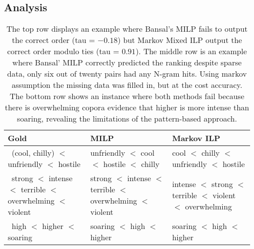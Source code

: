 \subsection{Analysis}


\begin{table}
\small
\centering
\begin{tabular}{|l|l|l|}
% 
\hline 
\bf Gold & \bf MILP & \bf Markov ILP \\
\hline
% 
\ \pbox{20cm}{(cool, chilly) \\ $<$ unfriendly \\ $<$ hostile } 
& \pbox{20cm}{unfriendly \\ $<$ cool \\ $<$ hostile \\ $<$ chilly }
& \pbox{20cm}{cool \\ $<$ chilly \\ $<$ unfriendly \\ $<$ hostile } \\
% 
\hline
% 
\ \pbox{20cm}{strong \\ $<$ intense \\ $<$ terrible \\ $<$ overwhelming \\ $<$ violent } 
& \pbox{20cm}{strong \\ $<$ intense \\ $<$ terrible \\ $<$ overwhelming \\ $<$ violent }
& \pbox{20cm}{intense \\ $<$ strong \\ $<$ terrible \\ $<$ violent \\ $<$ overwhelming } \\
% 
\hline
% 
\ \pbox{20cm}{high \\ $<$ higher \\ $<$ soaring }
& \pbox{20cm}{soaring \\ $<$ high \\ $<$ higher \\ }
& \pbox{20cm}{soaring \\ $<$ high \\ $<$ higher \\ }\\
% 
\hline
\end{tabular}
\caption{\label{font-table} The top row displays an example where Bansal's MILP fails to output the correct order (tau = $-0.18$) but Markov Mixed ILP output the correct order modulo ties (tau = $0.91$). The middle row is an example where Bansal' MILP correctly predicted the ranking despite sparse data, only six out of twenty pairs had any N-gram hits. Using markov assumption the missing data was filled in, but at the cost accuracy. The bottom row shows an instance where both methods fail because there is overwhelming copora evidence that higher is more intense than soaring, revealing the limitations of the pattern-based approach.}
\end{table}

